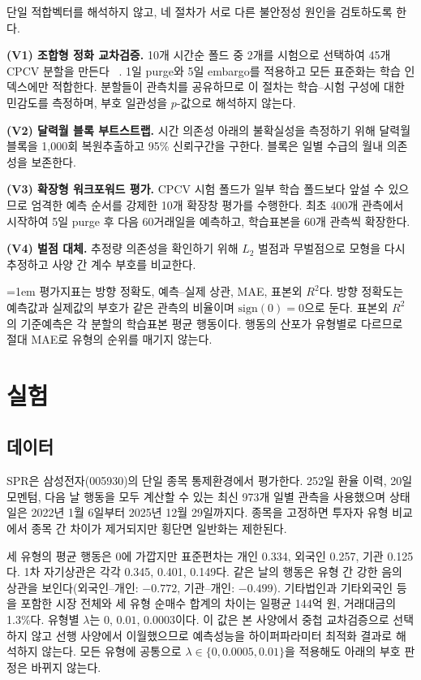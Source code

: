 단일 적합벡터를 해석하지 않고, 네 절차가 서로 다른 불안정성 원인을 검토하도록 한다.

\textbf{(V1) 조합형 정화 교차검증.}
10개 시간순 폴드 중 2개를 시험으로 선택하여 45개 CPCV 분할을 만든다
~\cite{lopez2018advances}. 1일 purge와 5일 embargo를 적용하고 모든 표준화는 학습
인덱스에만 적합한다. 분할들이 관측치를 공유하므로 이 절차는 학습--시험 구성에 대한
민감도를 측정하며, 부호 일관성을 $p$-값으로 해석하지 않는다.

\textbf{(V2) 달력월 블록 부트스트랩.}
시간 의존성 아래의 불확실성을 측정하기 위해 달력월 블록을 1{,}000회 복원추출하고
95\% 신뢰구간을 구한다. 블록은 일별 수급의 월내 의존성을 보존한다.

\textbf{(V3) 확장형 워크포워드 평가.}
CPCV 시험 폴드가 일부 학습 폴드보다 앞설 수 있으므로 엄격한 예측 순서를 강제한
10개 확장창 평가를 수행한다. 최초 400개 관측에서 시작하여 5일 purge 후 다음
60거래일을 예측하고, 학습표본을 60개 관측씩 확장한다.

\textbf{(V4) 벌점 대체.}
추정량 의존성을 확인하기 위해 $L_2$ 벌점과 무벌점으로 모형을 다시 추정하고 사양 간
계수 부호를 비교한다.

{\emergencystretch=1em
평가지표는 방향 정확도, 예측--실제 상관, MAE, 표본외 $R^2$다. 방향 정확도는 예측값과
실제값의 부호가 같은 관측의 비율이며 $\mathrm{sign}(0)=0$으로 둔다. 표본외 $R^2$의
기준예측은 각 분할의 학습표본 평균 행동이다. 행동의 산포가 유형별로 다르므로 절대
MAE로 유형의 순위를 매기지 않는다.
}

\section{실험}
\label{sec:experiments}

\subsection{데이터}
\label{sec:data}

SPR은 삼성전자(005930)의 단일 종목 통제환경에서 평가한다. 252일 환율 이력, 20일
모멘텀, 다음 날 행동을 모두 계산할 수 있는 최신 973개 일별 관측을 사용했으며 상태일은
2022년 1월 6일부터 2025년 12월 29일까지다. 종목을 고정하면 투자자 유형 비교에서
종목 간 차이가 제거되지만 횡단면 일반화는 제한된다.

세 유형의 평균 행동은 0에 가깝지만 표준편차는 개인 0.334, 외국인 0.257, 기관
0.125다. 1차 자기상관은 각각 0.345, 0.401, 0.149다. 같은 날의 행동은 유형 간 강한
음의 상관을 보인다(외국인--개인: $-0.772$, 기관--개인: $-0.499$). 기타법인과
기타외국인 등을 포함한 시장 전체와 세 유형 순매수 합계의 차이는 일평균 144억 원,
거래대금의 1.3\%다. 유형별 $\lambda$는 $0$, $0.01$, $0.0003$이다. 이 값은 본
사양에서 중첩 교차검증으로 선택하지 않고 선행 사양에서 이월했으므로 예측성능을
하이퍼파라미터 최적화 결과로 해석하지 않는다. 모든 유형에 공통으로
$\lambda\in\{0,0.0005,0.01\}$을 적용해도 아래의 부호 판정은 바뀌지 않는다.

